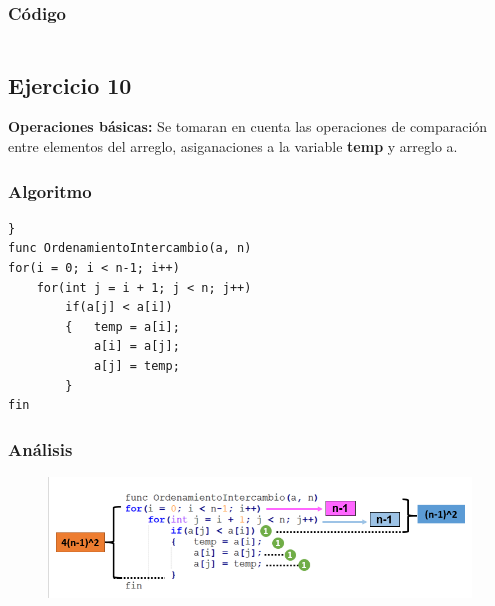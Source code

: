 \documentclass[12pt]{article}
\begin{document}
	        \subsubsection{Código}
	            \begin{lstlisting}[style=Java]
    		    \end{lstlisting}

	    \subsection{Ejercicio 10}	 

	    \textbf{Operaciones básicas:} Se tomaran en cuenta las operaciones de comparación entre elementos del arreglo, asiganaciones a la variable \textbf{temp} y arreglo a.

			\subsubsection{Algoritmo}
			    \begin{lstlisting}[style=Java]
	    }
func OrdenamientoIntercambio(a, n)	
for(i = 0; i < n-1; i++)
	for(int j = i + 1; j < n; j++)
		if(a[j] < a[i])
		{	temp = a[i];
			a[i] = a[j];
			a[j] = temp;
		}
fin
    		    \end{lstlisting}

    		\subsubsection{Análisis}

	    		\begin{figure}[h!]
	                \centering
	                \includegraphics[width=\textwidth]{Abigail/Images/EJER10.PNG}
	 		    \end{figure} 
\end{document}

